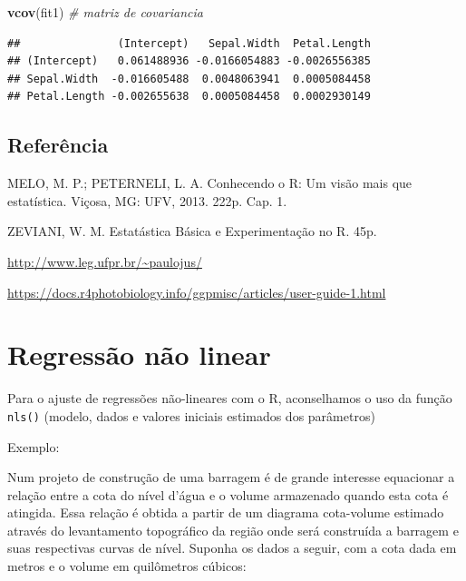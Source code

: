 \documentclass[
]{book}
\newenvironment{Shaded}{\begin{snugshade}}{\end{snugshade}}
\newcommand{\CommentTok}[1]{\textcolor[rgb]{0.56,0.35,0.01}{\textit{#1}}}
\newcommand{\KeywordTok}[1]{\textcolor[rgb]{0.13,0.29,0.53}{\textbf{#1}}}
\newcommand{\NormalTok}[1]{#1}
\begin{document}
\begin{Shaded}
\begin{Highlighting}[]
\KeywordTok{vcov}\NormalTok{(fit1) }\CommentTok{# matriz de covariancia }
\end{Highlighting}
\end{Shaded}

\begin{verbatim}
##               (Intercept)   Sepal.Width  Petal.Length
## (Intercept)   0.061488936 -0.0166054883 -0.0026556385
## Sepal.Width  -0.016605488  0.0048063941  0.0005084458
## Petal.Length -0.002655638  0.0005084458  0.0002930149
\end{verbatim}

\hypertarget{referuxeancia-6}{%
\subsection{Referência}\label{referuxeancia-6}}

MELO, M. P.; PETERNELI, L. A. Conhecendo o R: Um visão mais que estatística. Viçosa, MG: UFV, 2013. 222p. Cap. 1.

ZEVIANI, W. M. Estatástica Básica e Experimentação no R. 45p.

\url{http://www.leg.ufpr.br/~paulojus/}

\url{https://docs.r4photobiology.info/ggpmisc/articles/user-guide-1.html}

\hypertarget{regressuxe3o-nuxe3o-linear}{%
\section{Regressão não linear}\label{regressuxe3o-nuxe3o-linear}}

Para o ajuste de regressões não-lineares com o R, aconselhamos o uso da função \texttt{nls()} (modelo, dados e valores iniciais estimados dos parâmetros)

Exemplo:

Num projeto de construção de uma barragem é de grande interesse equacionar a relação entre a cota do nível d'água e o volume armazenado quando esta cota é atingida. Essa relação é obtida a partir de um diagrama cota-volume estimado através do levantamento topográfico da região onde será construída a barragem e suas respectivas curvas de nível. Suponha os dados a seguir, com a cota dada em metros e o volume em quilômetros cúbicos:
\end{document}
